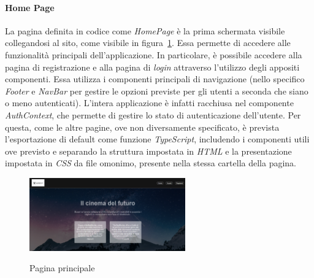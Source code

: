 \paragraph{Home Page}\label{par:home-page}

La pagina definita in codice come \textit{HomePage} è la prima schermata visibile collegandosi al sito, come visibile in figura~\ref{fig:pagina-principale}. Essa permette di accedere alle funzionalità principali dell'applicazione.
In particolare, è possibile accedere alla pagina di registrazione e alla pagina di \textit{login} attraverso l'utilizzo degli appositi componenti.
Essa utilizza i componenti principali di navigazione (nello specifico \textit{Footer} e \textit{NavBar} per gestire le opzioni 
previste per gli utenti a seconda che siano o meno autenticati). L'intera applicazione è infatti racchiusa nel componente \textit{AuthContext}, che permette di gestire lo stato di autenticazione dell'utente.
Per questa, come le altre pagine, ove non diversamente specificato, è prevista l'esportazione di default come funzione \textit{TypeScript}, includendo i componenti utili ove previsto e 
separando la struttura impostata in \textit{HTML} e la presentazione impostata in \textit{CSS} da file omonimo, presente nella stessa cartella della pagina.

\begin{figure}[ht]
    \centering
    \includegraphics[width=0.6\textwidth, alt={Pagina principale dell'applicazione}]{immagini/frontend/home.png}
    \caption{Pagina principale}\label{fig:pagina-principale}
\end{figure}

